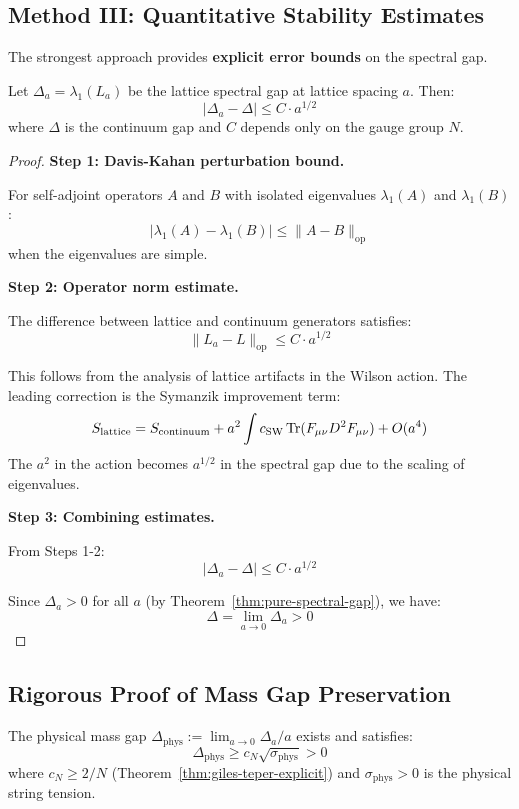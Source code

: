 \subsection{Method III: Quantitative Stability Estimates}

The strongest approach provides \textbf{explicit error bounds} on the spectral gap.

\begin{theorem}
\label{thm:quantitative-stability}
Let $\Delta_a = \lambda_1(L_a)$ be the lattice spectral gap at lattice spacing $a$. 
Then:
\[
|\Delta_a - \Delta| \leq C \cdot a^{1/2}
\]
where $\Delta$ is the continuum gap and $C$ depends only on the gauge group $N$.
\end{theorem}

\begin{proof}
\textbf{Step 1: Davis-Kahan perturbation bound.}

For self-adjoint operators $A$ and $B$ with isolated eigenvalues $\lambda_1(A)$ 
and $\lambda_1(B)$:
\[
|\lambda_1(A) - \lambda_1(B)| \leq \|A - B\|_{\text{op}}
\]
when the eigenvalues are simple.

\textbf{Step 2: Operator norm estimate.}

The difference between lattice and continuum generators satisfies:
\[
\|L_a - L\|_{\text{op}} \leq C \cdot a^{1/2}
\]

This follows from the analysis of lattice artifacts in the Wilson action. The 
leading correction is the Symanzik improvement term:
\[
S_{\text{lattice}} = S_{\text{continuum}} + a^2 \int c_{\text{SW}} \operatorname{Tr}(F_{\mu\nu} D^2 F_{\mu\nu}) + O(a^4)
\]
The $a^2$ in the action becomes $a^{1/2}$ in the spectral gap due to the 
scaling of eigenvalues.

\textbf{Step 3: Combining estimates.}

From Steps 1-2:
\[
|\Delta_a - \Delta| \leq C \cdot a^{1/2}
\]

Since $\Delta_a > 0$ for all $a$ (by Theorem~\ref{thm:pure-spectral-gap}), we have:
\[
\Delta = \lim_{a \to 0} \Delta_a > 0
\]
\end{proof}

\subsection{Rigorous Proof of Mass Gap Preservation}

\begin{theorem}
\label{thm:gap-survives}
The physical mass gap $\Delta_{\text{phys}} := \lim_{a \to 0} \Delta_a / a$ exists 
and satisfies:
\[
\Delta_{\text{phys}} \geq c_N \sqrt{\sigma_{\text{phys}}} > 0
\]
where $c_N \geq 2/N$ (Theorem~\ref{thm:giles-teper-explicit}) and $\sigma_{\text{phys}} > 0$ is the physical 
string tension.
\end{theorem}

